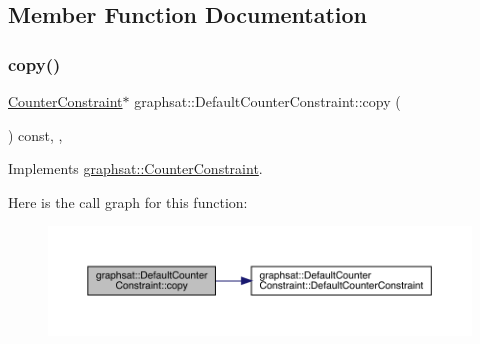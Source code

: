 \subsection{Member Function Documentation}
\mbox{\label{classgraphsat_1_1_default_counter_constraint_a5a5b4fcebd097f209ebdebcde1a7321f}} 
\subsubsection{\texorpdfstring{copy()}{copy()}}
{\footnotesize\ttfamily \mbox{\hyperlink{classgraphsat_1_1_counter_constraint}{Counter\+Constraint}}$\ast$ graphsat\+::\+Default\+Counter\+Constraint\+::copy (\begin{DoxyParamCaption}{ }\end{DoxyParamCaption}) const\hspace{0.3cm}{\ttfamily [inline]}, {\ttfamily [private]}, {\ttfamily [virtual]}}



Implements \mbox{\hyperlink{classgraphsat_1_1_counter_constraint_a880eb6520fcf80de35071d62cb31a640}{graphsat\+::\+Counter\+Constraint}}.

Here is the call graph for this function\+:
\nopagebreak
\begin{figure}[H]
\begin{center}
\leavevmode
\includegraphics[width=350pt]{classgraphsat_1_1_default_counter_constraint_a5a5b4fcebd097f209ebdebcde1a7321f_cgraph}
\end{center}
\end{figure}
\mbox{\label{classgraphsat_1_1_default_counter_constraint_a5f131f57aa2685073391c372405322dd}} 
